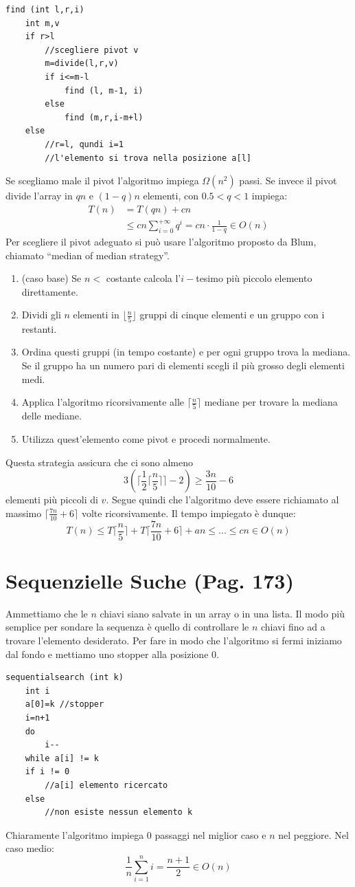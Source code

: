 \documentclass[a4paper]{book}
\newcommand{\lstIndent}{4}
\begin{document}
\begin{lstlisting}[tabsize=\lstIndent]
find (int l,r,i)
	int m,v
	if r>l
		//scegliere pivot v
		m=divide(l,r,v)
		if i<=m-l
			find (l, m-1, i)
		else
			find (m,r,i-m+l)
	else
		//r=l, qundi i=1
		//l'elemento si trova nella posizione a[l]	 			
\end{lstlisting}
Se scegliamo male il pivot l'algoritmo impiega $\Omega (n^2)$ passi. Se invece il pivot divide l'array in $qn$ e $(1-q)n$ elementi, con $0.5<q<1$ impiega:
\begin{align*}
T(n) &= T(qn)+cn \nonumber \\
& \leq  cn \sum_{i=0}^{+\infty} q^i = cn \cdot\frac{1}{1-q} \in O(n)
\end{align*}
Per scegliere il pivot adeguato si può usare l'algoritmo proposto da Blum, chiamato ``median of median strategy''.
\begin{enumerate}
\item (caso base) Se $n<$ costante calcola l'$i-$tesimo più piccolo elemento direttamente.
\item Dividi gli $n$ elementi in $\lfloor \frac{n}{5} \rfloor$ gruppi di cinque elementi e un gruppo con i restanti. 
\item Ordina questi gruppi (in tempo costante) e per ogni gruppo trova la mediana. Se il gruppo ha un numero pari di elementi scegli il più grosso degli elementi medi. 
\item Applica l'algoritmo ricorsivamente alle $\lceil \frac{n}{5} \rceil$ mediane per trovare la mediana delle mediane.
\item Utilizza quest'elemento come pivot e procedi normalmente.
\end{enumerate}
Questa strategia assicura che ci sono almeno 
$$ 3\left(\lceil \frac{1}{2} \lceil \frac{n}{5} \rceil \rceil -2\right) \geq \frac{3n}{10} -6$$
elementi più piccoli di $v$. Segue quindi che l'algoritmo deve essere richiamato al massimo $ \lceil \frac{7n}{10} + 6 \rceil$ volte ricorsivamente. Il tempo impiegato è dunque:
$$ T(n) \leq T\lceil \frac{n}{5} \rceil +T \lceil \frac{7n}{10} +6 \rceil + an \leq ... \leq cn \in O(n) $$
\section{Sequenzielle Suche (Pag. 173)}
Ammettiamo che le $n$ chiavi siano salvate in un array o in una lista. Il modo più semplice per sondare la sequenza è quello di controllare le $n$ chiavi fino ad a trovare l'elemento desiderato. Per fare in modo che l'algoritmo si fermi iniziamo dal fondo e mettiamo uno stopper alla posizione 0.
\begin{lstlisting}[tabsize=\lstIndent]
sequentialsearch (int k)
	int i
	a[0]=k //stopper
	i=n+1
	do
		i--
	while a[i] != k
	if i != 0
		//a[i] elemento ricercato
	else
		//non esiste nessun elemento k		
\end{lstlisting} 
Chiaramente l'algoritmo impiega 0 passaggi nel miglior caso e $n$ nel peggiore. Nel caso medio:
$$ \frac{1}{n} \sum_{i=1}^n i = \frac{n+1}{2} \in O(n) $$
\end{document}
